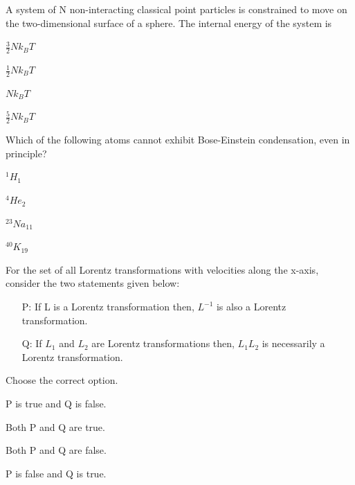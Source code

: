 \documentclass{exam}
\begin{document}
\begin{questions}
\question A system of N non-interacting classical point particles is constrained to move on the two-dimensional surface of a sphere. The internal energy of the system is\hfill{}

\begin{enumerate} \begin{multicols}{4}
	\item $\frac{3}{2}Nk_{B}T$ \item $\frac{1}{2}Nk_{B}T$ \item $Nk_{B}T$ \item $\frac{5}{2}Nk_{B}T$
\end{multicols} \end{enumerate}

\question Which of the following atoms cannot exhibit Bose-Einstein condensation, even in principle?\hfill{}

\begin{enumerate} \begin{multicols}{4}
	\item $^{1}H_{1}$ \item $^{4}He_{2}$ \item $^{23}Na_{11}$ \item $^{40}K_{19}$
\end{multicols} \end{enumerate}

\question For the set of all Lorentz transformations with velocities along the x-axis, consider the two statements given below:
	\begin{itemize}
		\item[P:] If L is a Lorentz transformation then, $L^{-1}$ is also a Lorentz transformation.
		\item[Q:] If $L_1$ and $L_2$ are Lorentz transformations then, $L_1L_2$ is necessarily a Lorentz transformation.
	\end{itemize}
	Choose the correct option.\hfill{}

\begin{enumerate}
\begin{multicols}{2}
	\item P is true and Q is false. \item Both P and Q are true.
	\item Both P and Q are false. \item P is false and Q is true.
	\end{multicols}
\end{enumerate}


\end{questions}
\end{document}
